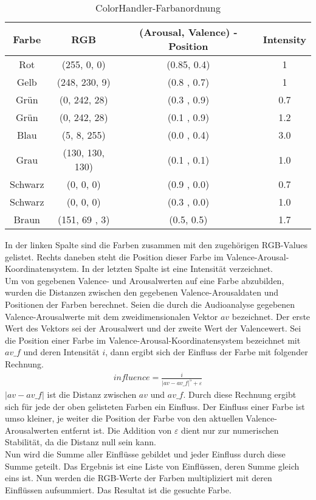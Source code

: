 \documentclass[11pt,a4paper]{article}
\begin{document}
\begin{table}[!ht]
\centering
\begin{tabular}{c | c | c | c}
	\textbf{Farbe} & \textbf{RGB} & (\textbf{Arousal}, \textbf{Valence}) -Position& \textbf{Intensity}\\
\hline
	Rot &	  (255, 0, 0) & (0.85, 0.4) & 1 \\ 
	Gelb &    (248, 230, 9) & (0.8 , 0.7) &  1 \\
	Grün &	  (0, 242, 28) & (0.3 , 0.9) &  0.7 \\
	Grün &	  (0, 242, 28) & (0.1 , 0.9) &  1.2 \\
	Blau &	  (5, 8, 255) & (0.0 , 0.4) &  3.0 \\
	Grau &	  (130, 130, 130) & (0.1 , 0.1) &  1.0 \\
	Schwarz & (0, 0, 0) & (0.9 , 0.0) &  0.7 \\
	Schwarz & (0, 0, 0) & (0.3 , 0.0) &  1.0 \\
	Braun &   (151, 69 , 3) & (0.5, 0.5) &  1.7 \\
\end{tabular}
\caption[ColorHandler Farbanordnung]{ColorHandler-Farbanordnung}
\label{tab:ColorHandlerFarbanordnung}
\end{table}
\noindent
In der linken Spalte sind die Farben zusammen mit den zugehörigen RGB-Values gelistet. Rechts daneben steht die Position dieser Farbe im Valence-Arousal-Koordinatensystem. In der letzten Spalte ist eine Intensität verzeichnet.\\
Um von gegebenen Valence- und Arousalwerten auf eine Farbe abzubilden, wurden die Distanzen zwischen den gegebenen Valence-Arousaldaten und Positionen der Farben berechnet. Seien die durch die Audioanalyse gegebenen Valence-Arousalwerte mit dem zweidimensionalen Vektor $av$ bezeichnet. Der erste Wert des Vektors sei der Arousalwert und der zweite Wert der Valencewert. Sei die Position einer Farbe im Valence-Arousal-Koordinatensystem bezeichnet mit $av\_f$ und deren Intensität $i$, dann ergibt sich der Einfluss der Farbe mit folgender Rechnung.
\begin{align}
influence = \frac{i}{\vert av - av\_f\vert^5 + \varepsilon}
\end{align}
\noindent
$\vert av - av\_f\vert$ ist die Distanz zwischen $av$ und $av\_f$. Durch diese Rechnung ergibt sich für jede der oben gelisteten Farben ein Einfluss. Der Einfluss einer Farbe ist umso kleiner, je weiter die Position der Farbe von den aktuellen Valence-Arousalwerten entfernt ist. Die Addition von $\varepsilon$ dient nur zur numerischen Stabilität, da die Distanz null sein kann.\\
Nun wird die Summe aller Einflüsse gebildet und jeder Einfluss durch diese Summe geteilt. Das Ergebnis ist eine Liste von Einflüssen, deren Summe gleich eins ist. Nun werden die RGB-Werte der Farben multipliziert mit deren Einflüssen aufsummiert. Das Resultat ist die gesuchte Farbe.
\end{document}
